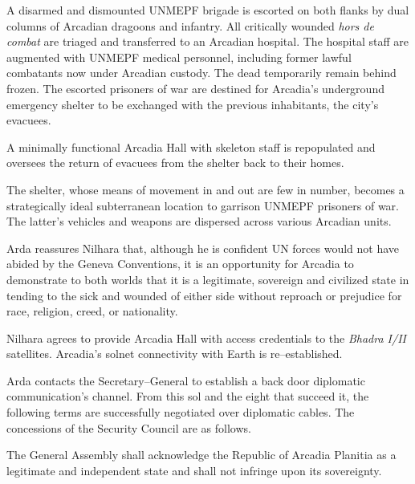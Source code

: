 

A disarmed and dismounted UNMEPF brigade is escorted on both flanks by dual columns of Arcadian dragoons and infantry. All critically wounded {\it hors de combat} are triaged and transferred to an Arcadian hospital. The hospital staff are augmented with UNMEPF medical personnel, including former lawful combatants now under Arcadian custody. The dead temporarily remain behind frozen. The escorted prisoners of war are destined for Arcadia's underground emergency shelter to be exchanged with the previous inhabitants, the city's evacuees.

A minimally functional Arcadia Hall with skeleton staff is repopulated and oversees the return of evacuees from the shelter back to their homes.

The shelter, whose means of movement in and out are few in number, becomes a strategically ideal subterranean location to garrison UNMEPF prisoners of war. The latter's vehicles and weapons are dispersed across various Arcadian units.

Arda reassures Nilhara that, although he is confident UN forces would not have abided by the Geneva Conventions, it is an opportunity for Arcadia to demonstrate to both worlds that it is a legitimate, sovereign and civilized state in tending to the sick and wounded of either side without reproach or prejudice for race, religion, creed, or nationality.
\StopTimelineDate

Nilhara agrees to provide Arcadia Hall with access credentials to the {\it Bhadra I/II} satellites. Arcadia's solnet connectivity with Earth is re--established.

Arda contacts the Secretary--General to establish a back door diplomatic communication's channel. From this sol and the eight that succeed it, the following terms are successfully negotiated over diplomatic cables. The concessions of the Security Council are as follows.

\startitemize[R]
\item The General Assembly shall acknowledge the Republic of Arcadia Planitia as a legitimate and independent state and shall not infringe upon its sovereignty.

